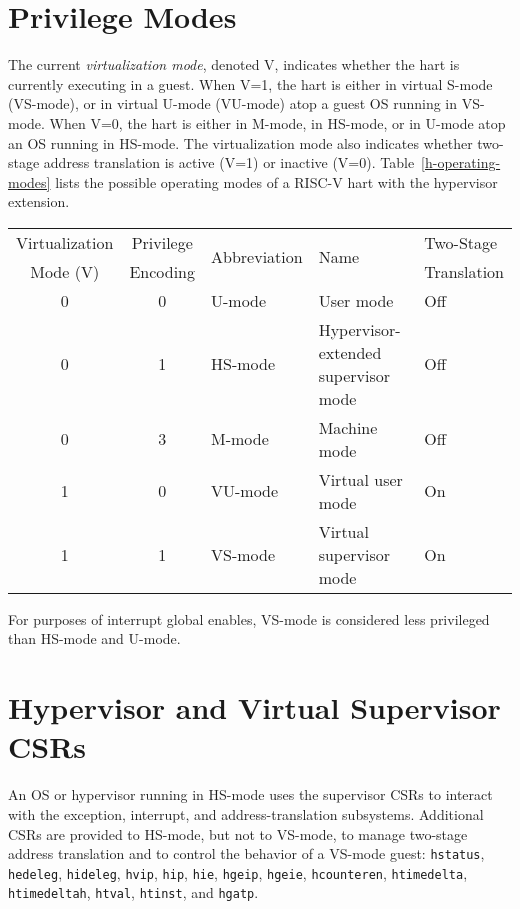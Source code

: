\section{Privilege Modes}

The current {\em virtualization mode}, denoted V, indicates whether the hart
is currently executing in a guest.
When V=1, the hart is either in virtual S-mode (VS-mode), or in virtual U-mode
(VU-mode) atop a guest OS running in VS-mode.
When V=0, the hart is either in M-mode, in HS-mode, or in U-mode atop an OS
running in HS-mode.
The virtualization mode also indicates whether two-stage address translation
is active (V=1) or inactive (V=0).  Table~\ref{h-operating-modes} lists the
possible operating modes of a RISC-V hart with the hypervisor extension.

\begin{table*}[h!]
\begin{center}
\begin{tabular}{|c|c||l|l|l|}
  \hline
   Virtualization & Privilege & \multirow{2}{*}{Abbreviation} & \multirow{2}{*}{Name} & Two-Stage \\
   Mode (V)       & Encoding  &                               &                       & Translation \\ \hline
   0              & 0         & U-mode  & User mode & Off \\
   0              & 1         & HS-mode & Hypervisor-extended supervisor mode & Off \\
   0              & 3         & M-mode  & Machine mode & Off \\
  \hline
   1              & 0         & VU-mode & Virtual user mode & On \\
   1              & 1         & VS-mode & Virtual supervisor mode & On \\
  \hline
 \end{tabular}
\end{center}
\caption{Operating modes with the hypervisor extension.}
\label{h-operating-modes}
\end{table*}

For purposes of interrupt global enables, VS-mode is considered less
privileged than HS-mode and U-mode.

\section{Hypervisor and Virtual Supervisor CSRs}

An OS or hypervisor running in HS-mode uses the supervisor CSRs to interact with the exception,
interrupt, and address-translation subsystems.
Additional CSRs are provided to HS-mode, but not to VS-mode, to manage
two-stage address translation and to control the behavior of a VS-mode guest:
{\tt hstatus}, {\tt hedeleg}, {\tt hideleg}, {\tt hvip}, {\tt hip}, {\tt hie},
{\tt hgeip}, {\tt hgeie},
{\tt hcounteren}, {\tt htimedelta}, {\tt htimedeltah}, {\tt htval},
{\tt htinst}, and {\tt hgatp}.

